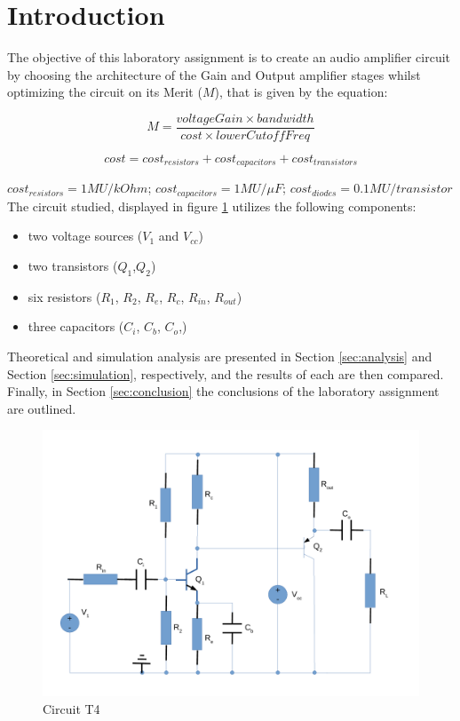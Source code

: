 
\section{Introduction}
\label{sec:introduction}



The objective of this laboratory assignment is to create an audio amplifier circuit by choosing the architecture of the Gain and Output amplifier stages whilst optimizing the circuit on its Merit ($M$), that is given by the equation:

\[
M = \frac{voltageGain\times bandwidth}{cost\times lowerCutoffFreq}
\]

\[
 cost = cost_{resistors} + cost_{capacitors} + cost_{transistors} 
\]

$cost_{resistors} = 1MU/kOhm$; $cost_{capacitors} = 1MU/\mu F$;
$cost_{diodes} = 0.1MU/transistor$ \\

The circuit studied, displayed in figure \ref{fig:Desenho_t4} utilizes the following components:

\begin{itemize}
	\item two voltage sources ($V_1$ and $V_{cc}$)
	\item two transistors ($Q_1$,$Q_2$)
	\item six resistors ($R_1$, $R_2$, $R_e$, $R_c$, $R_{in}$, $R_{out}$)
	\item three capacitors ($C_i$, $C_b$, $C_o$,)
\end{itemize}


Theoretical and simulation analysis are presented in Section \ref{sec:analysis} and Section \ref{sec:simulation}, respectively, and the results of each are then compared.
Finally, in Section \ref{sec:conclusion} the conclusions of the laboratory assignment are outlined. 



\begin{figure}[h]
	\centering
	\includegraphics[width=0.85\linewidth]{dsnh_t4.pdf}
	\caption{Circuit T4}
\label{fig:Desenho_t4}
\end{figure}



